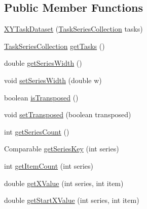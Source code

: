 \subsection*{Public Member Functions}
\begin{DoxyCompactItemize}
\item 
\mbox{\hyperlink{classorg_1_1jfree_1_1data_1_1gantt_1_1_x_y_task_dataset_abba26f27048d164e2cd340c8cd0b82c0}{X\+Y\+Task\+Dataset}} (\mbox{\hyperlink{classorg_1_1jfree_1_1data_1_1gantt_1_1_task_series_collection}{Task\+Series\+Collection}} tasks)
\item 
\mbox{\hyperlink{classorg_1_1jfree_1_1data_1_1gantt_1_1_task_series_collection}{Task\+Series\+Collection}} \mbox{\hyperlink{classorg_1_1jfree_1_1data_1_1gantt_1_1_x_y_task_dataset_ac7a8dfa51c807bee598741f8995b071d}{get\+Tasks}} ()
\item 
double \mbox{\hyperlink{classorg_1_1jfree_1_1data_1_1gantt_1_1_x_y_task_dataset_ab358434afb5a7ceb22e72c08a07115b1}{get\+Series\+Width}} ()
\item 
void \mbox{\hyperlink{classorg_1_1jfree_1_1data_1_1gantt_1_1_x_y_task_dataset_a8d2f868d7f2cba834f06f2e54131ede4}{set\+Series\+Width}} (double w)
\item 
boolean \mbox{\hyperlink{classorg_1_1jfree_1_1data_1_1gantt_1_1_x_y_task_dataset_ab3ff49031eb07439efcdb9b14d470cb3}{is\+Transposed}} ()
\item 
void \mbox{\hyperlink{classorg_1_1jfree_1_1data_1_1gantt_1_1_x_y_task_dataset_ac784b2fb23128cc85b9d4c14dd762d3a}{set\+Transposed}} (boolean transposed)
\item 
int \mbox{\hyperlink{classorg_1_1jfree_1_1data_1_1gantt_1_1_x_y_task_dataset_aa9b2839f31bc3fb79c2b9ebf7154cfc8}{get\+Series\+Count}} ()
\item 
Comparable \mbox{\hyperlink{classorg_1_1jfree_1_1data_1_1gantt_1_1_x_y_task_dataset_a6e0246de767964c1ae66fbdc3a2f4eb3}{get\+Series\+Key}} (int series)
\item 
int \mbox{\hyperlink{classorg_1_1jfree_1_1data_1_1gantt_1_1_x_y_task_dataset_a48fa86ab7e66f3a99100b7ffac52597e}{get\+Item\+Count}} (int series)
\item 
double \mbox{\hyperlink{classorg_1_1jfree_1_1data_1_1gantt_1_1_x_y_task_dataset_aa4e0735ca3ef93d31ff25870ddead3c2}{get\+X\+Value}} (int series, int item)
\item 
double \mbox{\hyperlink{classorg_1_1jfree_1_1data_1_1gantt_1_1_x_y_task_dataset_a142d508701d22e9653c03b99ab29be4a}{get\+Start\+X\+Value}} (int series, int item)
\item 

\end{DoxyCompactItemize}
